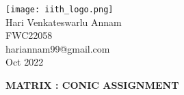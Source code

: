\documentclass[10pt,a4paper]{report}
\begin{document}
\begin{multicols}{2}
\raggedright {\texttt{[image: iith\_logo.png]}} \vspace{3mm}\\ \raggedleft Hari Venkateswarlu Annam\vspace{2mm}\\ 
\raggedleft  FWC22058\vspace{2mm}\\ 
\raggedleft hariannam99@gmail.com \vspace{2mm}\\ 
\raggedleft Oct 2022 \vspace{5mm}\\
\end{multicols}

\centering \Large \textbf{MATRIX : CONIC ASSIGNMENT} \normalsize \vspace{10mm}
\end{document}
